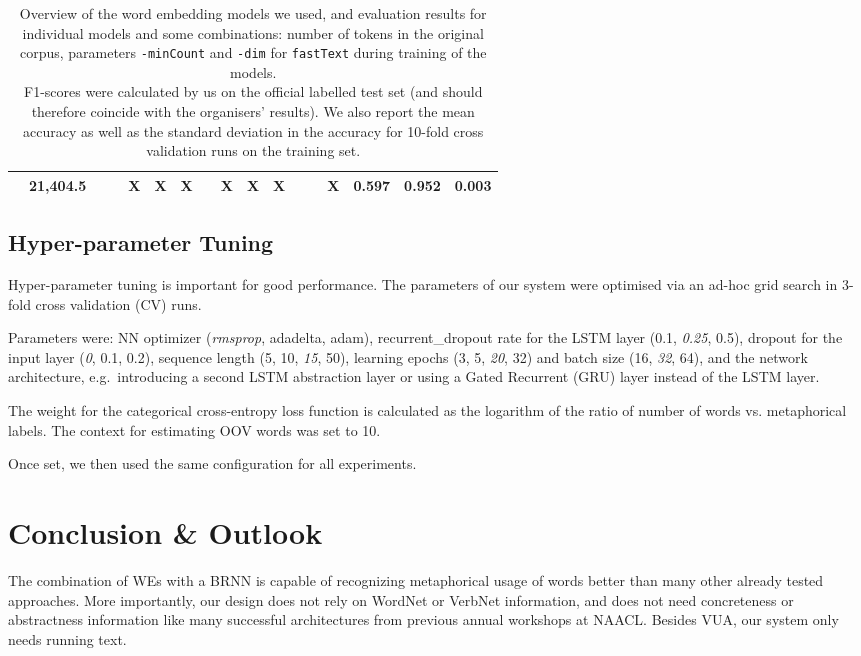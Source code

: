 \documentclass[11pt,a4paper]{article}
\newcommand\fT{\texttt{fastText}\xspace}
\begin{document}
\begin{table*}[t]
\begin{center}
\begin{tabular}{|l|S[table-format=6.1]|r|r||c|c|c|c|c|c|c|c|c|c||r|rr|}
    & 21,404.5  &  &   & X  & X & X  &  & X  & X & X &  &  & X & 0.597  & 0.952 & 0.003   \\
\hline
\end{tabular}
\end{center}
\caption{\label{tab:models}Overview of the word embedding models we used, and evaluation results for individual models and some combinations: number of tokens in the original corpus, parameters \texttt{-minCount} and \texttt{-dim} for \fT during training of the models. \\
F1-scores were calculated by us on the official labelled test set (and should therefore coincide with the organisers' results). 
We also report the mean accuracy as well as the standard deviation in the accuracy
for 10-fold cross validation runs on the training set.} 
\end{table*}


\subsection{Hyper-parameter Tuning} %
Hyper-parameter tuning is important for good performance. The parameters of our system were optimised via an ad-hoc grid search in 3-fold cross validation (CV) runs.

Parameters were:
NN optimizer (\emph{rmsprop}, adadelta, adam), recurrent\_dropout rate for the LSTM layer (0.1, \emph{0.25}, 0.5), dropout for the input layer (\emph{0}, 0.1, 0.2), sequence length (5, 10, \emph{15}, 50), learning epochs (3, 5, \emph{20}, 32) and batch size (16, \emph{32}, 64), and the network architecture, e.g.~introducing a second LSTM abstraction layer or using a Gated Recurrent (GRU) layer instead of the LSTM layer.

The weight for the categorical cross-entropy loss function is calculated as the logarithm of the ratio of number of words vs. metaphorical labels. The context for estimating OOV words was set to 10.

Once set, we then used the same configuration for all experiments.


\section{Conclusion \& Outlook} %
\label{sec:conclusion}

The combination of WEs with a BRNN is capable of recognizing metaphorical usage of words better than many other already tested approaches.
More importantly, our design does not rely on WordNet or VerbNet information, and does not need concreteness or abstractness information like many successful architectures from previous annual workshops at NAACL. 
Besides VUA, our system only needs running text.
\end{document}
